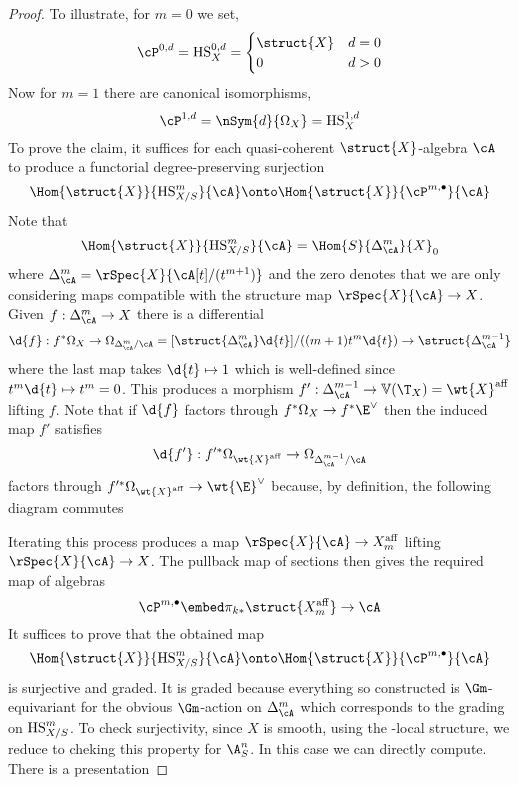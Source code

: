 \documentclass[12pt]{article}
\newcommand{\V}{\mathbb{V}}
\begin{document}
\begin{proof}
To illustrate, for $m = 0$ we set,
\[ \cP^{0,d} = \HS^{0,d}_{X} = \begin{cases}
\struct{X} & d = 0
\\
0 & d > 0
\end{cases} \]
Now for $m = 1$ there are canonical isomorphisms,
\[ \cP^{1,d} = \nSym{d}{\Omega_X} = \HS^{1,d}_{X} \]
To prove the claim, it suffices for each quasi-coherent $\struct{X}$-algebra $\cA$ to produce a functorial degree-preserving surjection
\[ \Hom{\struct{X}}{\HS_{X/S}^m}{\cA} \onto \Hom{\struct{X}}{\cP^{m,\bullet}}{\cA} \]
Note that
\[ \Hom{\struct{X}}{\HS_{X/S}^m}{\cA} = \Hom{S}{\Delta_{\cA}^m}{X}_0 \]
where $\Delta^m_{\cA} = \rSpec{X}{\cA[t]/(t^{m+1})}$ and the zero denotes that we are only considering maps compatible with the structure map $\rSpec{X}{\cA} \to X$. Given $f : \Delta^m_{\cA} \to X$ there is a differential
\[ \d{f} : f^* \Omega_X \to \Omega_{\Delta^m_{\cA}/\cA} = [\struct{\Delta_{\cA}^m} \d{t}]/((m+1) t^m \d{t}) \to \struct{\Delta^{m-1}_{\cA}} \]
where the last map takes $\d{t} \mapsto 1$ which is well-defined since $t^m \d{t} \mapsto t^m = 0$. This produces a morphism $f' : \Delta^{m-1}_{\cA} \to \V(\T_X) = \wt{X}^{\aff}$ lifting $f$. Note that if $\d{f}$ factors through $f^* \Omega_X \to f^* \E^\vee$ then the induced map $f'$ satisfies
\[ \d{f'} : f'^* \Omega_{\wt{X}^{\aff}} \to \Omega_{\Delta^{m-1}_{\cA}/\cA} \]
factors through $f'^* \Omega_{\wt{X}^{\aff}} \to \wt{\E}^\vee$ because, by definition, the following diagram commutes
\begin{center}
\end{center}
Iterating this process produces a map $\rSpec{X}{\cA} \to X_m^{\aff}$ lifting $\rSpec{X}{\cA} \to X$. The pullback map of sections then gives the required map of algebras 
\[ \cP^{m, \bullet} \embed \pi_{k*} \struct{X_m^{\aff}} \to \cA \]
It suffices to prove that the obtained map
\[ \Hom{\struct{X}}{\HS_{X/S}^m}{\cA} \onto \Hom{\struct{X}}{\cP^{m,\bullet}}{\cA} \]
is surjective and graded. It is graded because everything so constructed is $\Gm$-equivariant for the obvious $\Gm$-action on $\Delta_{\cA}^m$ which corresponds to the grading on $\mathrm{HS}_{X/S}^m$. To check surjectivity, since $X$ is smooth, using the \etale-local structure, we reduce to cheking this property for $\A^n_S$. In this case we can directly compute. There is a presentation

\end{proof}
\end{document}
